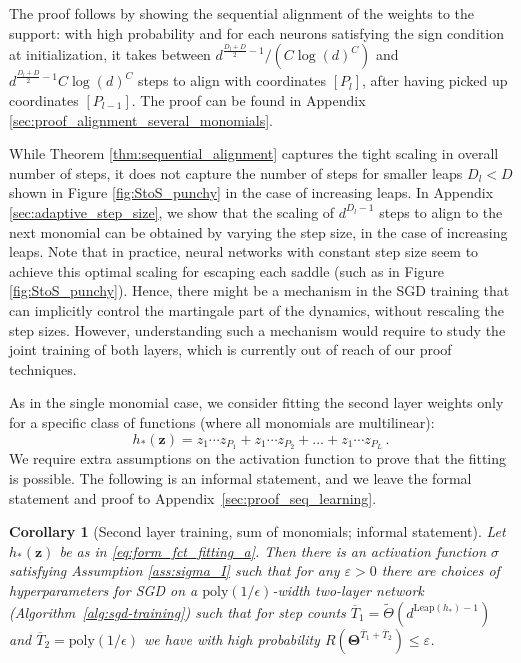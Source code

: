 \documentclass[11pt]{article}
\newcommand{\eps}{\varepsilon}
\newcommand{\<}{\langle}
\renewcommand{\>}{\rangle}
\newtheorem{corollary}{Corollary}
\theoremstyle{definition}
\def\bz{{\boldsymbol z}}
\def\bTheta{{\boldsymbol \Theta}}
\def\bz{{\boldsymbol z}}
\def\bTheta{{\boldsymbol \Theta}}
\def\bz{{\boldsymbol z}}
\def\bTheta{{\boldsymbol \Theta}}
\def\eps{\varepsilon}
\def\Leap{\mathrm{Leap}}
\def\oT{\overline{T}}
\newcommand{\poly}{\mathrm{poly}}
\begin{document}
The proof follows by showing the sequential alignment of the weights to the support: with high probability and for each neurons satisfying the sign condition at initialization, it takes between $d^{\frac{D_l +D}{2}- 1}/(C \log(d)^{C})$ and $ d^{\frac{D_l +D}{2}- 1} C \log(d)^{C}$ steps to align with coordinates $[P_l]$, after having picked up coordinates $[P_{l-1}]$. The proof can be found in Appendix \ref{sec:proof_alignment_several_monomials}. 

While Theorem \ref{thm:sequential_alignment} captures the tight scaling in overall number of steps, it does not capture the number of steps for smaller leaps $D_l < D$ shown in Figure \ref{fig:StoS_punchy} in the case of increasing leaps. In Appendix \ref{sec:adaptive_step_size}, we show that the scaling of $d^{D_l -1}$ steps to align to the next monomial can be obtained by varying the step size, in the case of increasing leaps. Note that in practice, neural networks with constant step size seem to achieve this optimal scaling for escaping each saddle (such as in Figure \ref{fig:StoS_punchy}). Hence, there might be a mechanism in the SGD training that can implicitly control the martingale part of the dynamics, without rescaling the step sizes. However, understanding such a mechanism would require to study the joint training of both layers, which is currently out of reach of our proof techniques.



As in the single monomial case, we consider fitting the second layer weights only for a specific class of functions (where all monomials are multilinear):
\begin{equation}\label{eq:form_fct_fitting_a}
h_* (\bz) = z_1 \cdots z_{P_1} + z_1 \cdots z_{P_2} + \ldots + z_1 \cdots z_{P_L} \, .
\end{equation}
 We require extra assumptions on the activation function to prove that the fitting is possible. The following is an informal statement, and we leave the formal statement and proof to Appendix~\ref{sec:proof_seq_learning}.
 
\begin{corollary}[Second layer training, sum of monomials; informal statement]\label{cor:sequential_learning}
Let $h_*(\bz)$ be as in \eqref{eq:form_fct_fitting_a}. Then there is an activation function $\sigma$ satisfying Assumption \ref{ass:sigma_I} such that for any $\eps> 0$ there are choices of hyperparameters for SGD on a $\poly(1/\epsilon)$-width two-layer network (Algorithm~\ref{alg:sgd-training}) such that for step counts $\oT_1 = \tilde{\Theta}(d^{\Leap(h_*) -1 })$ and $\oT_2 = \poly(1/\epsilon)$ we have with high probability $R ( \bTheta^{\oT_1 + \oT_2} ) \leq \eps$.
\end{corollary}
\end{document}
